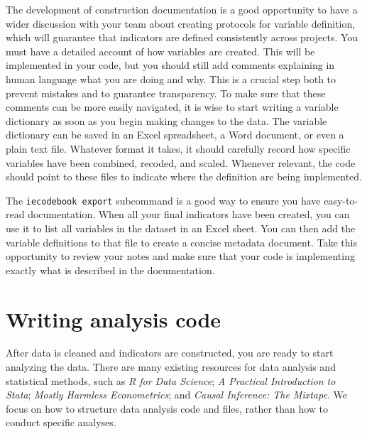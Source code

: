 The development of construction documentation is a good opportunity to have
a wider discussion with your team about creating protocols for variable definition,
which will guarantee that indicators are defined consistently across projects.
You must have a detailed account of how variables are created.
This will be implemented in your code, but you should still
add comments explaining in human language what you are doing and why.
This is a crucial step both to prevent mistakes and to guarantee transparency.
To make sure that these comments can be more easily navigated,
it is wise to start writing a variable dictionary as soon as you begin making changes to the data.
The variable dictionary can be saved in an Excel spreadsheet,
a Word document, or even a plain text file.
Whatever format it takes,
it should carefully record how specific variables have been combined, recoded, and scaled.
Whenever relevant, the code should point to these files to indicate
where the definition are being implemented.

The \texttt{iecodebook export} subcommand is
a good way to ensure you have easy-to-read documentation.
When all your final indicators have been created,
you can use it to list all variables in the dataset in an Excel sheet.
You can then add the variable definitions to that file to create a concise metadata document.
Take this opportunity to review your notes and make sure that your code
is implementing exactly what is described in the documentation.


\section{Writing analysis code}

After data is cleaned and indicators are constructed, you are ready to start analyzing the data.
There are many existing resources for data analysis and statistical methods, such as
\textit{R for Data Science};
\textit{A Practical Introduction to Stata};
\textit{Mostly Harmless Econometrics};
and \textit{Causal Inference: The Mixtape}.
We focus on how to structure data analysis code and files, rather than how to conduct specific analyses.


